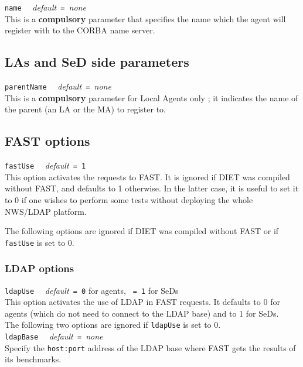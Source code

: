 \noindent
\texttt{name} \ \ \emph{default}\texttt{ = }\emph{none}\\
This is a \textbf{compulsory} parameter that specifies the name which the agent
will register with to the CORBA name server.


\subsection{LAs and SeD side parameters}

\noindent
\texttt{parentName} \ \ \emph{default}\texttt{ = }\emph{none}\\
This is a \textbf{compulsory} parameter for Local Agents only ; it indicates the
name of the parent (an LA or the MA) to register to.


\subsection{FAST options}

\noindent
\texttt{fastUse} \ \ \emph{default}\texttt{ = 1}\\
This option activates the requests to FAST. It is ignored if DIET was
compiled without FAST, and defaults to 1 otherwise. In the latter case, it is
useful to set it to 0 if one wishes to perform some tests
without deploying the whole NWS/LDAP platform.

The following options are ignored if DIET was compiled without FAST or if
\texttt{fastUse} is set to 0.

\subsubsection{LDAP options}

\noindent
\texttt{ldapUse} \ \ \emph{default}\texttt{ = 0} for agents, \texttt{ = 1} for
SeDs\\
This option activates the use of LDAP in FAST requests. It defaults to 0 for
agents (which do not need to connect to the LDAP base) and to 1 for SeDs.
\\

The following two options are ignored if \texttt{ldapUse} is set to 0.
\\

\noindent
\texttt{ldapBase} \ \ \emph{default}\texttt{ = }\emph{none}\\
Specify the \texttt{host:port} address of the LDAP base where FAST gets the
results of its benchmarks.
\\

